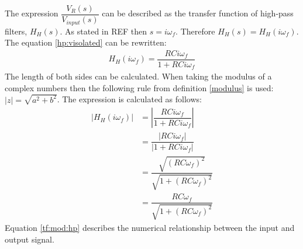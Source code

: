 The expression $\dfrac{V_{R}(s)}{V_{input}(s)}$ can be described as the transfer function of high-pass filters, $H_{H}(s)$. As stated in REF then $s=i \omega_f$. Therefore $H_{H}(s)=H_{H}(i \omega_f)$. The equation \eqref{hp:visolated} can be rewritten:
\begin{align*}
H_{H}(i \omega_f) = \dfrac{RCi \omega_f}{1 + RCi \omega_f}
\end{align*}
The length of both sides can be calculated. When taking the modulus of a complex numbers then the following rule from definition \ref{modulus} is used: $|z|= \sqrt{a^2+b^2}$. The expression is calculated as follows:
\begin{align}
\left|H_{H}(i \omega_f)\right| &= \left|\dfrac{RCi \omega_f}{1 + RCi \omega_f} \right| \\
 &= \dfrac{|RCi \omega_f|}{|1 + RCi \omega_f |} \\
 &= \dfrac{\sqrt{(RC \omega_f)^2}}{\sqrt{1 + (RC \omega_f)^2 }} \\
 &= \dfrac{RC \omega_f}{\sqrt{1 + (RC \omega_f)^2 }} \label{tf:mod:hp}
\end{align}
Equation \eqref{tf:mod:hp} describes the numerical relationship between the input and output signal.
